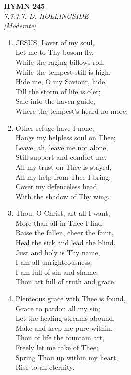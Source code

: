 \newpage
\begin{center}
    {\Large \textbf{HYMN 245}}
    \\
    \textit{7.7.7.7. D. HOLLINGSIDE}
    \\
    \textit{\small [Moderate]}
\end{center}
\vspace{1em}

\begin{enumerate}
    \item JESUS, Lover of my soul, \\
            Let me to Thy bosom fly, \\
        While the raging billows roll, \\
            While the tempest still is high. \\
        Hide me, O my Saviour, hide, \\
            Till the storm of life is o'er; \\
        Safe into the haven guide, \\
            Where the tempest's heard no more.

    \item Other refuge have I none, \\
            Hangs my helpless soul on Thee; \\
        Leave, ah, leave me not alone, \\
            Still support and comfort me. \\
        All my trust on Thee is stayed, \\
            All my help from Thee I bring; \\
        Cover my defenceless head \\
            With the shadow of Thy wing.

    \item Thou, O Christ, art all I want, \\
            More than all in Thee I find; \\
        Raise the fallen, cheer the faint, \\
            Heal the sick and lead the blind. \\
        Just and holy is Thy name, \\
            I am all unrighteousness, \\
        I am full of sin and shame, \\
            Thou art full of truth and grace.

    \item Plenteous grace with Thee is found, \\
            Grace to pardon all my sin; \\
        Let the healing streams abound, \\
            Make and keep me pure within. \\
        Thou of life the fountain art, \\
            Freely let me take of Thee; \\
        Spring Thou up within my heart, \\
            Rise to all eternity.

\end{enumerate}

